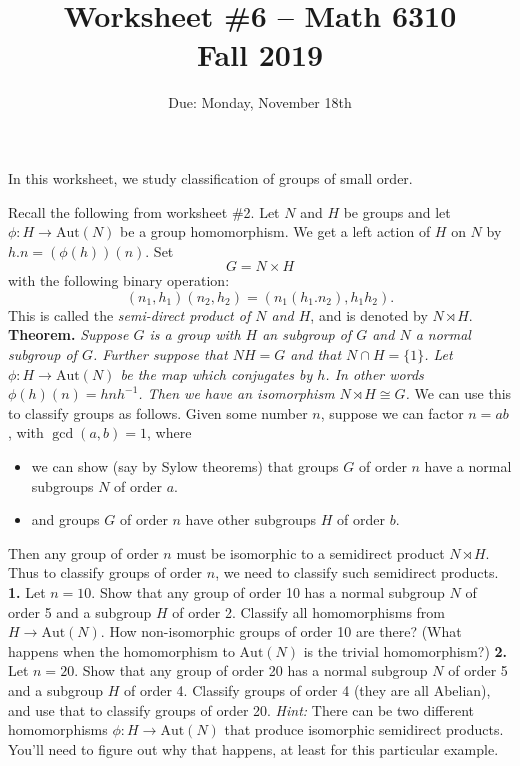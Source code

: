 \documentclass[11pt]{amsart}
\theoremstyle{theorem}
\renewcommand{\to}[1][]{\xrightarrow{\ #1\ }}
\newcommand{\Aut}{\mathrm{Aut}}
\begin{document}
\title{Worksheet \#6 -- Math 6310\\Fall 2019}
\author{Due: Monday, November 18th}
\maketitle

\noindent
\vskip 9pt
\noindent
In this worksheet, we study classification of groups of small order.

Recall the following from worksheet \#2.  
\vskip 9pt
Let $N$ and $H$ be groups and let $\phi : H \to \text{Aut}(N)$ be a group homomorphism.  We get a left action of $H$ on $N$ by $h.n = (\phi(h))(n)$.
Set
\[
G = N \times H
\]
with the following binary operation:
\[
(n_1, h_1)(n_2, h_2) = (n_1 (h_1.n_2), h_1 h_2).
\]
This is called the \emph{semi-direct product of $N$ and $H$}, and is denoted by $N \rtimes H$.
\vskip 6pt
\noindent
{\bf Theorem.}  {\it Suppose $G$ is a group with $H$ an subgroup of $G$ and $N$ a normal subgroup of $G$.  Further suppose that $NH = G$ and that $N \cap H = \{ 1 \}$.  Let $\phi : H \to \mathrm{Aut}(N)$ be the map which conjugates by $h$.  In other words $\phi(h)(n) = hnh^{-1}$.  Then we have an isomorphism $N \rtimes H \cong G$.}
\vskip 3pt
We can use this to classify groups as follows.  Given some number $n$, suppose we can factor $n = ab$, with $\gcd(a,b) = 1$, where 
\begin{itemize}
    \item{} we can show (say by Sylow theorems) that groups $G$ of order $n$ have a normal subgroups $N$ of order $a$.
    \item{} and groups $G$ of order $n$ have other subgroups $H$ of order $b$.
\end{itemize}
Then any group of order $n$ must be isomorphic to a semidirect product $N \rtimes H$.  Thus to classify groups of order $n$, we need to classify such semidirect products.
\vskip 6pt
{\bf 1.}  Let $n = 10$.  Show that any group of order 10 has a normal subgroup $N$ of order 5 and a subgroup $H$ of order 2.  Classify all homomorphisms from $H \to \Aut(N)$.  How non-isomorphic groups of order 10 are there? (What happens when the homomorphism to $\Aut(N)$ is the trivial homomorphism?)
\newpage
\noindent
{\bf 2.}  Let $n = 20$.  Show that any group of order 20 has a normal subgroup $N$ of order 5 and a subgroup $H$ of order 4.  Classify groups of order 4 (they are all Abelian), and use that to classify groups of order 20.  
\vskip 3pt
\emph{Hint: }  There can be two different homomorphisms $\phi : H \to \Aut(N)$ that produce isomorphic semidirect products.  You'll need to figure out why that happens, at least for this particular example.  
\end{document}
